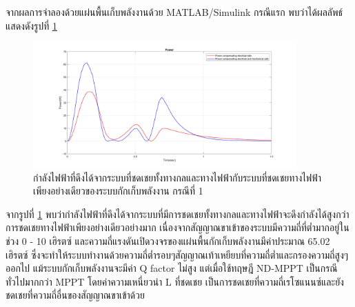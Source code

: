 \documentclass[11pt,a4paper]{article}
\begin{document}
จากผลการจำลองด้วยแผ่นพื้นเก็บพลังงานด้วย MATLAB/Simulink กรณีแรก พบว่าได้ผลลัพธ์ แสดงดังรูปที่ \ref{power_dc_case1}
\begin{figure}[H]
    \begin{center}
        \includegraphics[width=0.9\textwidth]{power_dc_case1.jpg}
    \end{center}
    \caption{กำลังไฟฟ้าที่ดึงได้จากระบบที่ชดเชยทั้งทางกลและทางไฟฟ้ากับระบบที่ชดเชยทางไฟฟ้าเพียงอย่างเดียวของระบบกักเก็บพลังงาน กรณีที่ 1}
    \label{power_dc_case1}
\end{figure}
จากรูปที่ \ref{power_dc_case1} พบว่ากำลังไฟฟ้าที่ดึงได้จากระบบที่มีการชดเชยทั้งทางกลและทางไฟฟ้าจะดึงกำลังได้สูงกว่าการชดเชยทางไฟฟ้าเพียงอย่างเดียวอย่างมาก เนื่องจากสัญญาณขาเข้าของระบบมีความถี่ที่ต่ำมากอยู่ในช่วง 0 - 10 เฮิรตซ์ และความถี่แรงดันเปิดวงจรของแผ่นพื้นกักเก็บพลังงานมีค่าประมาณ  65.02 เฮิรตซ์ 
ซึ่งจะทำให้ระบบทำงานด้วยความถี่ต่ำรอบๆสัญญาณเท้าเหยียบที่ความถี่ต่ำและกรองความถี่สูงๆออกไป แม้ระบบกักเก็บพลังงานจะมีค่า Q factor ไม่สูง แต่เมื่อใช้ทฤษฎี ND-MPPT เป็นกรณีทั่วไปมากกว่า MPPT โดยค่าความเหนี่ยวนำ L ที่ชดเชย เป็นการชดเชยที่ความถี่เรโซแนนซ์และยังชดเชยที่ความถี่อื่นของสัญญาณขาเข้าด้วย
\end{document}
